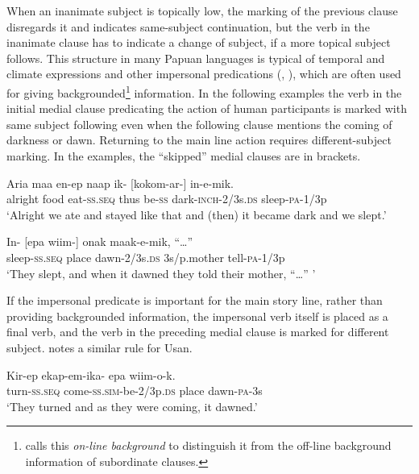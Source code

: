 When an inanimate subject is topically low, the  marking of the previous clause disregards it and indicates same-subject continuation, but the verb in the inanimate clause has to indicate a change of subject, if a more topical subject follows. This structure in many Papuan languages is typical of temporal and climate expressions and other impersonal predications (\citealt{Reesink1983a}, \citealt{Roberts1988b}), which are often used for giving backgrounded\footnote{\citet[244]{Farr1999} calls this \textit{on-line background} to distinguish it from the off-line background information of subordinate clauses.} information. In the following examples the verb in the initial medial clause predicating the action of human participants is marked with same subject following even when the following clause mentions the coming of darkness or dawn. Returning to the main line action requires different-subject marking. In the examples, the ``skipped'' medial clauses are in brackets.

\ea%
\label{ex:8:x1482}
\gll Aria  maa  en-ep  naap  ik-  [kokom-ar-] in-e-mik.\\
alright  food  eat-\textsc{ss}.\textsc{seq} thus be-\textsc{ss} dark-\textsc{inch}-2/3s.\textsc{ds} sleep-\textsc{pa}-1/3p\\
\glt`Alright we ate and stayed like that and (then) it became dark and we slept.'
\z


\ea%
\label{ex:8:x1475}
\gll In-  [epa  wiim-]  onak  maak-e-mik,  ``{\dots''}\\
sleep-\textsc{ss}.\textsc{seq} place dawn-2/3s.\textsc{ds} 3s/p.mother  tell-\textsc{pa}-1/3p\\
\glt`They slept, and when it dawned they told their mother, ``{\dots}'' '
\z


If the impersonal predicate is important for the main story line, rather than providing backgrounded information, the impersonal verb itself is placed as a final verb, and the verb in the preceding medial clause is marked for different subject. \citet[206]{Reesink1987} notes a similar rule for Usan. 

\ea%
\label{ex:8:x1492}
\gll Kir-ep  ekap-em-ika-  epa  wiim-o-k. \\
turn-\textsc{ss}.\textsc{seq} come-\textsc{ss}.\textsc{sim}-be-2/3p.\textsc{ds} place dawn-\textsc{pa}-3s\\
\glt`They turned and as they were coming, it dawned.'
\z


